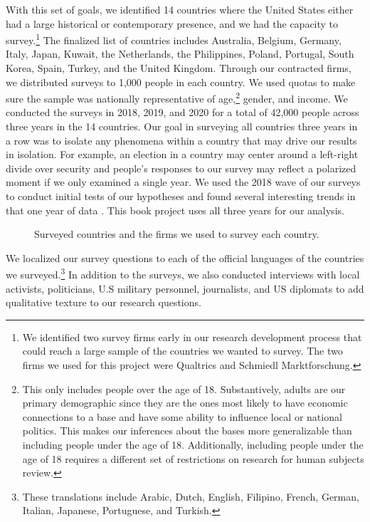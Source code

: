 With this set of goals, we identified 14 countries where the United States either had a large historical or contemporary presence, and we had the capacity to survey.\footnote{We identified two survey firms early in our research development process that could reach a large sample of the countries we wanted to survey. The two firms we used for this project were Qualtrics and Schmiedl Marktforschung.} The finalized list of countries includes Australia, Belgium, Germany, Italy, Japan, Kuwait, the Netherlands, the Philippines, Poland, Portugal, South Korea, Spain, Turkey, and the United Kingdom. Through our contracted firms, we distributed surveys to 1,000 people in each country. We used quotas to make sure the sample was nationally representative of age,\footnote{This only includes people over the age of 18. Substantively, adults are our primary demographic since they are the ones most likely to have economic connections to a base and have some ability to influence local or national politics. This makes our inferences about the bases more generalizable than including people under the age of 18. Additionally, including people under the age of 18 requires a different set of restrictions on research for human subjects review.} gender, and income. We conducted the surveys in 2018, 2019, and 2020 for a total of 42,000 people across three years in the 14 countries. Our goal in surveying all countries three years in a row was to isolate any phenomena within a country that may drive our results in isolation. For example, an election in a country may center around a left-right divide over security and people's responses to our survey may reflect a polarized moment if we only examined a single year. We used the 2018 wave of our surveys to conduct initial tests of our hypotheses and found several interesting trends in that one year of data \cite{Allen2020}. This book project uses all three years for our analysis. 

	\begin{figure}[t]
	\centering{}
	\caption{Surveyed countries and the firms we used to survey each country.}
	\label{fig:surveycoverage}
	\end{figure}	

We localized our survey questions to each of the official languages of the countries we surveyed.\footnote{These translations include Arabic, Dutch, English, Filipino, French, German, Italian, Japanese, Portuguese, and Turkish.}  In addition to the surveys, we also conducted interviews with local activists, politicians, U.S military personnel, journalists, and US diplomats to add qualitative texture to our research questions. 

